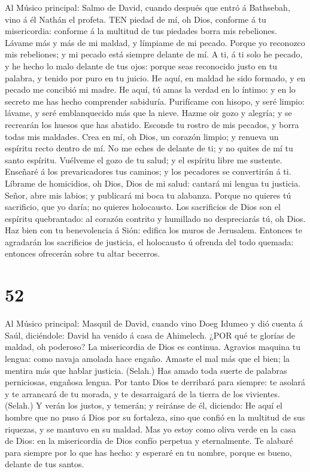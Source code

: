  Al Músico principal: Salmo de David, cuando después que
entró á Bathsebah, vino á él Nathán el profeta. TEN piedad de mí, oh
Dios, conforme á tu misericordia: conforme á la multitud de tus piedades
borra mis rebeliones.  Lávame más y más de mi maldad, y
límpiame de mi pecado.  Porque yo reconozco mis rebeliones;
y mi pecado está siempre delante de mí.  A ti, á ti solo he
pecado, y he hecho lo malo delante de tus ojos: porque seas reconocido
justo en tu palabra, y tenido por puro en tu juicio.  He
aquí, en maldad he sido formado, y en pecado me concibió mi madre.
 He aquí, tú amas la verdad en lo íntimo: y en lo secreto me
has hecho comprender sabiduría.  Purifícame con hisopo, y
seré limpio: lávame, y seré emblanquecido más que la nieve. 
Hazme oir gozo y alegría; y se recrearán los huesos que has abatido.
 Esconde tu rostro de mis pecados, y borra todas mis
maldades.  Crea en mí, oh Dios, un corazón limpio; y
renueva un espíritu recto dentro de mí.  No me eches de
delante de ti; y no quites de mí tu santo espíritu. 
Vuélveme el gozo de tu salud; y el espíritu libre me sustente.
 Enseñaré á los prevaricadores tus caminos; y los pecadores
se convertirán á ti.  Líbrame de homicidios, oh Dios, Dios
de mi salud: cantará mi lengua tu justicia.  Señor, abre
mis labios; y publicará mi boca tu alabanza.  Porque no
quieres tú sacrificio, que yo daría; no quieres holocausto.
 Los sacrificios de Dios son el espíritu quebrantado: al
corazón contrito y humillado no despreciarás tú, oh Dios. 
Haz bien con tu benevolencia á Sión: edifica los muros de Jerusalem.
 Entonces te agradarán los sacrificios de justicia, el
holocausto ú ofrenda del todo quemada: entonces ofrecerán sobre tu altar
becerros.

\hypertarget{section-51}{%
\section{52}\label{section-51}}

 Al Músico principal: Masquil de David, cuando vino Doeg
Idumeo y dió cuenta á Saúl, diciéndole: David ha venido á casa de
Ahimelech. ¿POR qué te glorías de maldad, oh poderoso? La misericordia
de Dios es continua.  Agravios maquina tu lengua: como
navaja amolada hace engaño.  Amaste el mal más que el bien;
la mentira más que hablar justicia. (Selah.)  Has amado toda
suerte de palabras perniciosas, engañosa lengua.  Por tanto
Dios te derribará para siempre: te asolará y te arrancará de tu morada,
y te desarraigará de la tierra de los vivientes. (Selah.)  Y
verán los justos, y temerán; y reiránse de él, diciendo:  He
aquí el hombre que no puso á Dios por su fortaleza, sino que confió en
la multitud de sus riquezas, y se mantuvo en su maldad.  Mas
yo estoy como oliva verde en la casa de Dios: en la misericordia de Dios
confío perpetua y eternalmente.  Te alabaré para siempre por
lo que has hecho: y esperaré en tu nombre, porque es bueno, delante de
tus santos.

